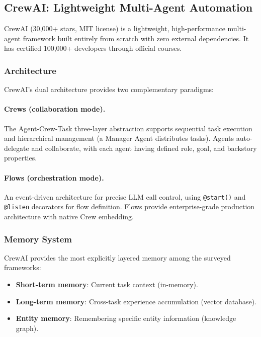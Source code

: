 \subsection{CrewAI: Lightweight Multi-Agent Automation}

CrewAI (30,000+ stars, MIT license) is a lightweight, high-performance multi-agent framework built entirely from scratch with zero external dependencies. It has certified 100,000+ developers through official courses.

\subsubsection{Architecture}

CrewAI's dual architecture provides two complementary paradigms:

\paragraph{Crews (collaboration mode).}
The Agent-Crew-Task three-layer abstraction supports sequential task execution and hierarchical management (a Manager Agent distributes tasks). Agents auto-delegate and collaborate, with each agent having defined role, goal, and backstory properties.

\paragraph{Flows (orchestration mode).}
An event-driven architecture for precise LLM call control, using \texttt{@start()} and \texttt{@listen} decorators for flow definition. Flows provide enterprise-grade production architecture with native Crew embedding.

\subsubsection{Memory System}

CrewAI provides the most explicitly layered memory among the surveyed frameworks:
\begin{itemize}
    \item \textbf{Short-term memory}: Current task context (in-memory).
    \item \textbf{Long-term memory}: Cross-task experience accumulation (vector database).
    \item \textbf{Entity memory}: Remembering specific entity information (knowledge graph).
\end{itemize}

